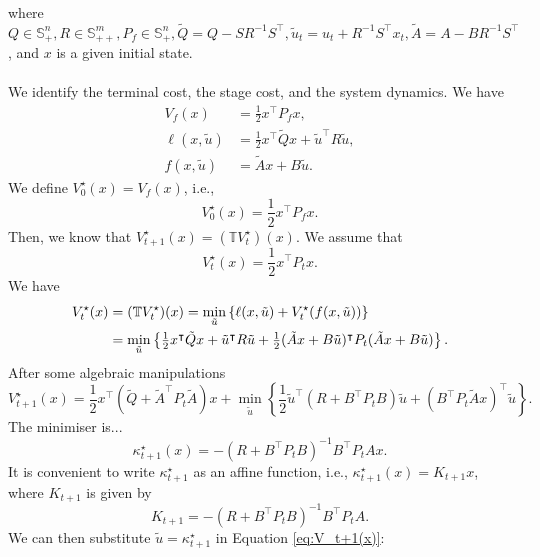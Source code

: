 \documentclass[a4paper,11pt,reqno]{amsart}
\newcommand{\tran}{\intercal}
\begin{document}
where $Q\in \mathbb{S}^n_+, R\in \mathbb{S}^m_{++}, P_f\in \mathbb{S}^n_{+}, \tilde{Q}=Q-SR^{-1}S^{\tran}, \tilde{u}_t=u_t+R^{-1}S^{\tran}x_t, \tilde{A}=A-BR^{-1}S^{\tran}$, and $x$ is a given initial state.
\\ \\
We identify the terminal cost, the stage cost, and the system dynamics. We have
\begin{align}
    V_f(x)&=\textstyle\frac{1}{2}x^{\tran}P_fx,\\
    \ell(x,\tilde{u})&=\textstyle\frac{1}{2}x^{\tran}\tilde{Q}x+\tilde{u}^{\tran}R\tilde{u},\\
    f(x,\tilde{u})&=\tilde{A}x+B\tilde{u}.
\end{align}
We define $V_{0}^{\star}(x)=V_f(x)$, i.e.,
\begin{equation}
    V_{0}^{\star}(x)=\textstyle\frac{1}{2}x^{\tran}P_fx.
\end{equation}
Then, we know that $V_{t+1}^{\star}(x)=(\mathbb{T}V_t^{\star})(x)$. We assume that
\begin{equation}
    V_t^{\star}(x)=\textstyle\frac{1}{2}x^{\tran}P_tx.
\end{equation}
We have
\begin{align} 
    V_t^{\star}(x)&=(\mathbb{T}V_t^{\star})(x)=\min_{\tilde{u}}\left\{\ell(x,\tilde{u})+V_t^{\star}(f(x,\tilde{u}))\right\} \notag\\
    &=\min_{\tilde{u}}\left\{\textstyle\frac{1}{2}x^{\tran}\tilde{Q}x+\tilde{u}^{\tran}R\tilde{u}+\frac{1}{2}(\tilde{A}x+B\tilde{u})^{\tran}P_t(\tilde{A}x+B\tilde{u})\right\}.
\end{align}
After some algebraic manipulations
\begin{equation}
    V_{t+1}^{\star}(x)=\textstyle\frac{1}{2}x^{\tran}(\tilde{Q}+\tilde{A}^{\tran}P_t\tilde{A})x+\min_{\tilde{u}}\left\{\textstyle\frac{1}{2}\tilde{u}^{\tran}(R+B^{\tran}P_tB)\tilde{u}+(B^{\tran}P_t\tilde{A}x)^{\tran}\tilde{u}\right\}.
    \label{eq:V_t+1(x)}
\end{equation}
The minimiser is...
\begin{equation}
    \kappa_{t+1}^{\star}(x)=-(R+B^{\tran}P_tB)^{-1}B^{\tran}P_tAx.
\end{equation}
It is convenient to write $\kappa^{\star}_{t+1}$ as an affine function, i.e., $\kappa_{t+1}^{\star}(x)=K_{t+1}x$, where $K_{t+1}$ is given by
\begin{equation}
    K_{t+1}=-(R+B^{\tran}P_tB)^{-1}B^{\tran}P_tA.
\end{equation}
We can then substitute $\tilde{u}=\kappa_{t+1}^{\star}$ in Equation \eqref{eq:V_t+1(x)}:
\end{document}
